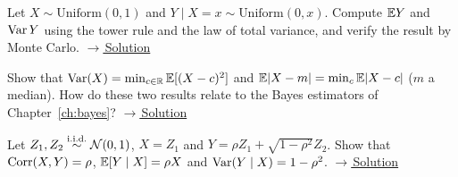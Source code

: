 \documentclass[main.tex]{subfiles}
\begin{document}
\begin{exercise}\label{exr:03-2}
Let $X\sim\text{Uniform}(0,1)$ and $Y\mid X=x\sim\text{Uniform}(0,x)$. Compute $\mathbb{E} Y$ and $\operatorname{Var} Y$ using the tower rule and the law of total variance, and verify the result by Monte Carlo.
\hfill\hyperref[coz:03-2]{\footnotesize$\rightarrow$\,Solution}
\end{exercise}

\begin{exercise}\label{exr:03-3}
Show that $\operatorname{Var}(X)=\min_{c\in\mathbb{R}}\mathbb{E}[(X-c)^2]$ and $\mathbb{E}|X-m|=\min_{c}\mathbb{E}|X-c|$ ($m$ a median). How do these two results relate to the Bayes estimators of Chapter~\ref{ch:bayes}?
\hfill\hyperref[coz:03-3]{\footnotesize$\rightarrow$\,Solution}
\end{exercise}

\begin{exercise}\label{exr:03-4}
Let $Z_1,Z_2\overset{\text{i.i.d.}}{\sim}\mathcal{N}(0,1)$, $X=Z_1$ and $Y=\rho Z_1+\sqrt{1-\rho^2}Z_2$. Show that $\operatorname{Corr}(X,Y)=\rho$, $\mathbb{E}[Y\mid X]=\rho X$ and $\operatorname{Var}(Y\mid X)=1-\rho^2$.
\hfill\hyperref[coz:03-4]{\footnotesize$\rightarrow$\,Solution}
\end{exercise}

\end{document}
